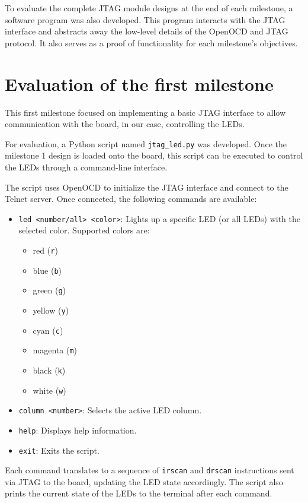 \documentclass[a4paper,11pt,oneside]{report}
\begin{document}
To evaluate the complete JTAG module designs at the end of each milestone, a software program was also developed.  
This program interacts with the JTAG interface and abstracts away the low-level details of the OpenOCD and JTAG protocol.  
It also serves as a proof of functionality for each milestone's objectives.

\section{Evaluation of the first milestone}

This first milestone focused on implementing a basic JTAG interface to allow communication with the board, in our case, controlling the LEDs.

For evaluation, a Python script named \texttt{jtag\_led.py} was developed.  
Once the milestone 1 design is loaded onto the board, this script can be executed to control the LEDs through a command-line interface.

The script uses OpenOCD to initialize the JTAG interface and connect to the Telnet server.  
Once connected, the following commands are available:
\begin{itemize}
    \item \texttt{led <number/all> <color>}: Lights up a specific LED (or all LEDs) with the selected color. Supported colors are:
    \begin{itemize}
        \item red (\texttt{r})
        \item blue (\texttt{b})
        \item green (\texttt{g})
        \item yellow (\texttt{y})
        \item cyan (\texttt{c})
        \item magenta (\texttt{m})
        \item black (\texttt{k})
        \item white (\texttt{w})
    \end{itemize}
    \item \texttt{column <number>}: Selects the active LED column.
    \item \texttt{help}: Displays help information.
    \item \texttt{exit}: Exits the script.
\end{itemize}

Each command translates to a sequence of \texttt{irscan} and \texttt{drscan} instructions sent via JTAG to the board, updating the LED state accordingly.  
The script also prints the current state of the LEDs to the terminal after each command.
\end{document}
